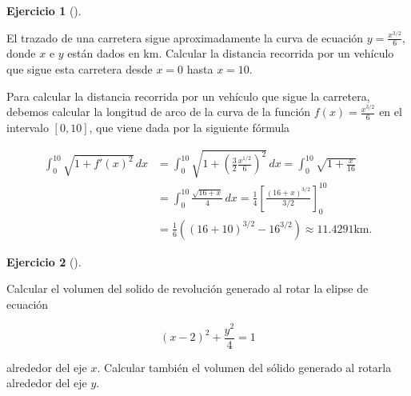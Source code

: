 \documentclass[
  spanish,
  a4paper,
]{scrreport}
\theoremstyle{definition}
\newtheorem{exercise}{Ejercicio}[chapter]
\theoremstyle{remark}
\begin{document}
\begin{exercise}[]\protect\hypertarget{exr-2}{}\label{exr-2}

El trazado de una carretera sigue aproximadamente la curva de ecuación
\(y=\frac{x^{3/2}}{6}\), donde \(x\) e \(y\) están dados en km. Calcular
la distancia recorrida por un vehículo que sigue esta carretera desde
\(x=0\) hasta \(x=10\).

\end{exercise}

\begin{tcolorbox}[enhanced jigsaw, arc=.35mm, bottomrule=.15mm, bottomtitle=1mm, breakable, colback=white, colbacktitle=quarto-callout-tip-color!10!white, colframe=quarto-callout-tip-color-frame, coltitle=black, left=2mm, leftrule=.75mm, opacityback=0, opacitybacktitle=0.6, rightrule=.15mm, title=\textcolor{quarto-callout-tip-color}{\faLightbulb}\hspace{0.5em}{Solución}, titlerule=0mm, toprule=.15mm, toptitle=1mm]

Para calcular la distancia recorrida por un vehículo que sigue la
carretera, debemos calcular la longitud de arco de la curva de la
función \(f(x)=\frac{x^{3/2}}{6}\) en el intervalo \([0,10]\), que viene
dada por la siguiente fórmula

\begin{align*}
\int_0^{10}  \sqrt{1+f'(x)^2}\,dx 
&= \int_0^{10} \sqrt{1+\left(\frac{3}{2}\frac{x^{1/2}}{6}\right)^2}\,dx
= \int_0^{10} \sqrt{1+\frac{x}{16}} \\
&= \int_0^{10} \frac{\sqrt{16+x}}{4}\,dx
= \frac{1}{4}\left[\frac{(16+x)^{3/2}}{3/2}\right]_0^{10} \\
&= \frac{1}{6}\left((16+10)^{3/2}-16^{3/2}\right)
\approx 11.4291 \mbox{km}.
\end{align*}

\end{tcolorbox}

\begin{exercise}[]\protect\hypertarget{exr-3}{}\label{exr-3}

Calcular el volumen del solido de revolución generado al rotar la elipse
de ecuación

\[
(x-2)^2 + \frac{y^2}{4} = 1
\]

alrededor del eje \(x\). Calcular también el volumen del sólido generado
al rotarla alrededor del eje \(y\).

\end{exercise}
\end{document}
